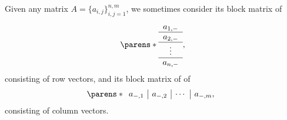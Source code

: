 \begin{definition}
  Given any matrix \( A = \{ a_{i,j} \}_{i,j=1}^{n,m} \), we sometimes consider its block matrix of 
  \begin{equation*}
    \parens*{\begin{array}{c}
      a_{1,-} \\
      \hline
      a_{2,-} \\
      \hline
      \vdots \\
      \hline
      a_{n,-}
    \end{array}},
  \end{equation*}
  consisting of row vectors, and its block matrix of of 
  \begin{equation*}
    \parens*{\begin{array}{c|c|c|c}
      a_{-,1} & a_{-,2} & \cdots & a_{-,m},
    \end{array}}
  \end{equation*}
  consisting of column vectors.
\end{definition}

